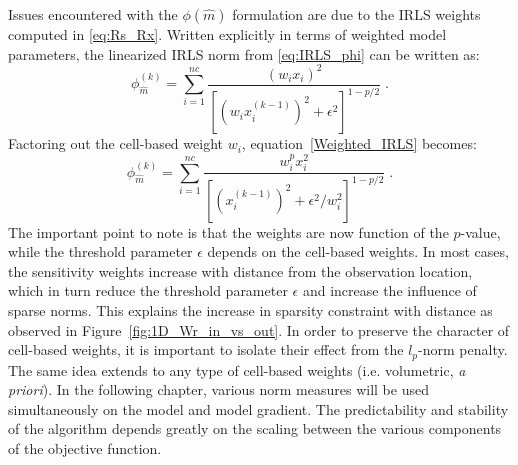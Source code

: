 Issues encountered with the $\phi({\hat m})$ formulation are due to the IRLS weights computed in \ref{eq:Rs_Rx}.
Written explicitly in terms of weighted model parameters, the linearized IRLS norm from \ref{eq:IRLS_phi} can be written as:
\begin{equation}\label{Weighted_IRLS}
\phi_{\hat m}^{(k)} =  \sum^{nc}_{i=1} \frac{{(w_i x_i)}^2}{ {\left[{(w_i x_i^{(k-1)})}^2 + \epsilon^2 \right ]}^{1-p/2}} \;.
\end{equation}
Factoring out the cell-based weight $w_i$, equation~\ref{Weighted_IRLS} becomes:
\begin{equation}\label{Weighted_IRLS_Facto}
\phi_{\hat m}^{(k)} =  \sum^{nc}_{i=1}  \frac{w_i^p x_i^2}{ {\left[{(x_i^{(k-1)})}^2 + \epsilon^2/w_i^2 \right ]}^{1-p/2}} \;.
\end{equation}
The important point to note is that the weights are now function of the $p$-value, while the threshold parameter $\epsilon$ depends on the cell-based weights.
In most cases, the sensitivity weights increase with distance from the observation location, which in turn reduce the threshold parameter $\epsilon$ and increase the influence of sparse norms.
This explains the increase in sparsity constraint with distance as observed in Figure~\ref{fig:1D_Wr_in_vs_out}.
In order to preserve the character of cell-based weights, it is important to isolate their effect from the $l_p$-norm penalty.
The same idea extends to any type of cell-based weights (i.e. volumetric, \emph{a priori}).
In the following chapter, various norm measures will be used simultaneously on the model and model gradient.
The predictability and stability of the algorithm depends greatly on the scaling between the various components of the objective function.

